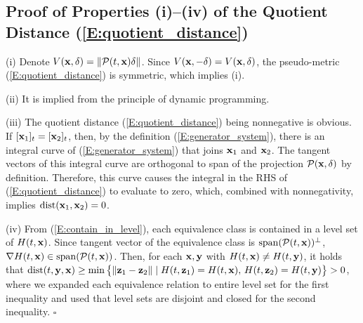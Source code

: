 \appendix



\subsection{Proof of Properties (i)--(iv) of the Quotient Distance (\ref{E:quotient_distance})}

\noindent (i) Denote $V(\mathbf{x}, \delta) = \|\mathcal P(t, \mathbf{x}) \delta \|$. 
Since $V(\mathbf{x}, -\delta) = V(\mathbf{x}, \delta)$, the pseudo-metric (\ref{E:quotient_distance}) is symmetric, which implies (i). 

\noindent (ii) It is implied from the principle of dynamic programming. 

\noindent (iii) The quotient distance (\ref{E:quotient_distance}) being nonnegative is obvious. If $[\mathbf{x}_1]_t = [\mathbf{x}_2]_t$, then, by the definition (\ref{E:generator_system}), there is an integral curve of (\ref{E:generator_system}) that joins $\mathbf{x}_1$ and $\mathbf{x}_2$. The tangent vectors of this integral curve are orthogonal to span of the projection $\mathcal P(\mathbf{x}, \delta)$ by definition. Therefore, this curve causes the integral in the RHS of (\ref{E:quotient_distance}) to evaluate to zero, which, combined with nonnegativity, implies $\mathrm{dist}(\mathbf{x}_1, \mathbf{x}_2) = 0$.

\noindent (iv) From (\ref{E:contain_in_level}), each equivalence class is contained in a level set of $H(t, \mathbf{x})$. Since tangent vector of the equivalence class is $\mathrm{span}(\mathcal P(t, \mathbf{x}))^\perp$, $\nabla H(t, \mathbf{x}) \in \mathrm{span}(\mathcal P(t, \mathbf{x}))$. Then, for each $\mathbf{x}, \mathbf{y}$ with $H(t, \mathbf{x}) \neq H(t, \mathbf{y})$, it holds that $\mathrm{dist}(t, \mathbf{y}, \mathbf{x}) \geq \min\big\{\|\mathbf{z}_1 - \mathbf{z}_2\|\mid H(t, \mathbf{z}_1) = H(t, \mathbf{x}),\, H(t, \mathbf{z}_2) = H(t, \mathbf{y})\big\} > 0$, where we expanded each equivalence relation to entire level set for the first inequality and used that level sets are disjoint and closed for the second inequality. \hfill $\square$

